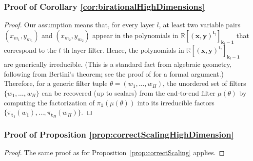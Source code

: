 \documentclass[twoside]{article}
\theoremstyle{definition}
\theoremstyle{remark}
\begin{document}
\subsubsection{Proof of Corollary \ref{cor:birationalHighDimensions}}
\begin{proof}
    Our assumption means that, for every layer $l$, at least two variable pairs $(x_{m_1},y_{m_1})$ and $(x_{m_2},y_{m_2})$ appear in the polynomials in $\mathbb{R}[(\boldsymbol{x},\boldsymbol{y})^{\boldsymbol{t}_l}]_{\boldsymbol{k}_l-\boldsymbol{1}}$ that correspond to the $l$-th layer filter.
    Hence, the polynomials in $\mathbb{R}[(\boldsymbol{x},\boldsymbol{y})^{\boldsymbol{t}_l}]_{\boldsymbol{k}_l-\boldsymbol{1}}$ are generically irreducible. (This is a standard fact from algebraic geometry, following from Bertini's theorem; see the proof of \cite[Corollary~4.16]{kohn2022geometry} for a formal argument.)
    Therefore, for a generic filter tuple $\theta=(w_1, \ldots, w_H)$, the unordered set of filters  $\{w_1, \ldots, w_H \}$ can be recovered (up to scalars) from the end-to-end filter $\mu(\theta)$ by computing the factorization of $\pi_{\boldsymbol{1}}(\mu(\theta))$ into its irreducible factors $\{ \pi_{\boldsymbol{t}_1}(w_1), \ldots, \pi_{\boldsymbol{t}_H}(w_H) \}$.
\end{proof}



\subsubsection{Proof of Proposition \ref{prop:correctScalingHighDimension}}
\begin{proof}
    The same proof as for Proposition~\ref{prop:correctScaling} applies.
\end{proof}
\end{document}
